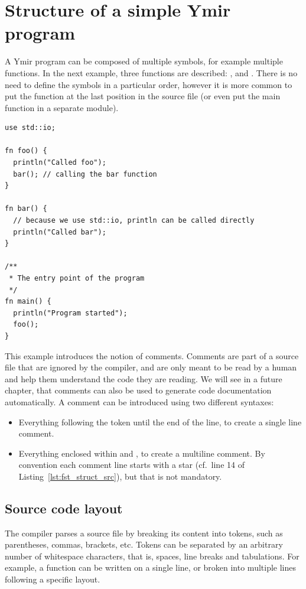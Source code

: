 \section{Structure of a simple Ymir program}

A Ymir program can be composed of multiple symbols, for example multiple
functions. In the next example, three functions are described: ,
 and . There is no need to define the symbols in a
particular order, however it is more common to put the  function at
the last position in the source file (or even put the main function in a
separate module).

\begin{lstlisting}[style=coloredverbatim, caption=First structured source file, label=lst:fst_struct_src]
use std::io;

fn foo() {
  println("Called foo");
  bar(); // calling the bar function
}

fn bar() {
  // because we use std::io, println can be called directly
  println("Called bar");
}

/**
 * The entry point of the program
 */
fn main() {
  println("Program started");
  foo();
}
\end{lstlisting}

This example introduces the notion of comments. Comments are part of a source
file that are ignored by the compiler, and are only meant to be read by a human
and help them understand the code they are reading. We will see in a future
chapter, that comments can also be used to generate code documentation
automatically. A comment can be introduced using two different syntaxes:
\begin{itemize}
\item Everything following the token \token{//} until the end of the line, to
  create a single line comment.
\item Everything enclosed within \token{/*} and \token{*/}, to create a multiline
  comment. By convention each comment line starts with a star (cf.\ line 14 of
  Listing~\ref{lst:fst_struct_src}), but that is not mandatory.
\end{itemize}

\subsection{Source code layout}

The compiler parses a source file by breaking its content into tokens, such as
parentheses, commas, brackets, etc. Tokens can be separated by an arbitrary
number of whitespace characters, that is, spaces, line breaks and tabulations. For
example, a function can be written on a single line, or broken into multiple
lines following a specific layout.


